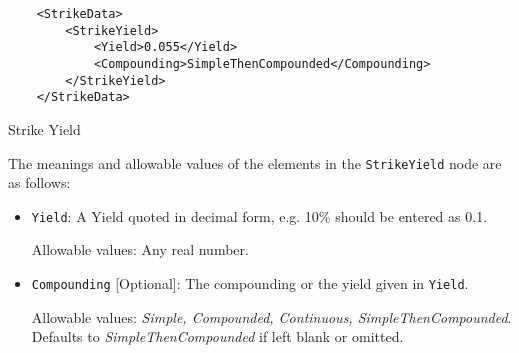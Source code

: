\begin{listing}[H]
\begin{verbatim}
	<StrikeData>
		<StrikeYield>
			<Yield>0.055</Yield>
			<Compounding>SimpleThenCompounded</Compounding>
		</StrikeYield>
	</StrikeData>
\end{verbatim}
\caption{Strike Yield}
\label{lst:strikeyield}
\end{listing}

The meanings and allowable values of the elements in the \lstinline!StrikeYield! node are as follows:

\begin{itemize}

\item \lstinline!Yield!: A Yield quoted in decimal form, e.g. 10\% should be entered as 0.1.

Allowable values: Any real number.

\item \lstinline!Compounding! [Optional]: The compounding or the yield given in  \lstinline!Yield!. 

Allowable values: {\em Simple, Compounded, Continuous, SimpleThenCompounded}. Defaults to \emph{SimpleThenCompounded} if left blank or omitted.

\end{itemize}
